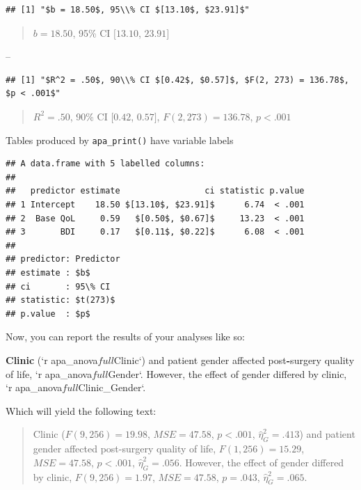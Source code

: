 \documentclass[man,floatsintext]{apa6}
\newenvironment{Shaded}{\begin{snugshade}}{\end{snugshade}}
\newcommand{\KeywordTok}[1]{\textcolor[rgb]{0.13,0.29,0.53}{\textbf{#1}}}
\newcommand{\DataTypeTok}[1]{\textcolor[rgb]{0.13,0.29,0.53}{#1}}
\newcommand{\StringTok}[1]{\textcolor[rgb]{0.31,0.60,0.02}{#1}}
\newcommand{\OperatorTok}[1]{\textcolor[rgb]{0.81,0.36,0.00}{\textbf{#1}}}
\newcommand{\NormalTok}[1]{#1}
\theoremstyle{definition}
\theoremstyle{definition}
\theoremstyle{definition}
\theoremstyle{remark}
\begin{document}
\begin{verbatim}
## [1] "$b = 18.50$, 95\\% CI $[13.10$, $23.91]$"
\end{verbatim}

\begin{quote}
\(b = 18.50\), 95\% CI \([13.10\), \(23.91]\)
\end{quote}

--

\begin{verbatim}
## [1] "$R^2 = .50$, 90\\% CI $[0.42$, $0.57]$, $F(2, 273) = 136.78$, $p < .001$"
\end{verbatim}

\begin{quote}
\(R^2 = .50\), 90\% CI \([0.42\), \(0.57]\), \(F(2, 273) = 136.78\),
\(p < .001\)
\end{quote}

Tables produced by \texttt{apa\_print()} have variable labels

\begin{verbatim}
## A data.frame with 5 labelled columns:
## 
##   predictor estimate                 ci statistic p.value
## 1 Intercept    18.50 $[13.10$, $23.91]$      6.74  < .001
## 2  Base QoL     0.59   $[0.50$, $0.67]$     13.23  < .001
## 3       BDI     0.17   $[0.11$, $0.22]$      6.08  < .001
## 
## predictor: Predictor 
## estimate : $b$ 
## ci       : 95\% CI 
## statistic: $t(273)$ 
## p.value  : $p$
\end{verbatim}

Now, you can report the results of your analyses like so:

\begin{Shaded}
\begin{Highlighting}[]
\KeywordTok{Clinic}\NormalTok{ (}\StringTok{`}\DataTypeTok{r apa_anova$full$Clinic}\StringTok{`}\NormalTok{) and patient gender affected post}\OperatorTok{-}\NormalTok{surgery quality of life, }\StringTok{`}\DataTypeTok{r apa_anova$full$Gender}\StringTok{`}\NormalTok{. However, the effect of gender differed by clinic, }\StringTok{`}\DataTypeTok{r apa_anova$full$Clinic_Gender}\StringTok{`}\NormalTok{.}
\end{Highlighting}
\end{Shaded}

Which will yield the following text:

\begin{quote}
Clinic (\(F(9, 256) = 19.98\), \(\mathit{MSE} = 47.58\), \(p < .001\),
\(\hat{\eta}^2_G = .413\)) and patient gender affected post-surgery
quality of life, \(F(1, 256) = 15.29\), \(\mathit{MSE} = 47.58\),
\(p < .001\), \(\hat{\eta}^2_G = .056\). However, the effect of gender
differed by clinic, \(F(9, 256) = 1.97\), \(\mathit{MSE} = 47.58\),
\(p = .043\), \(\hat{\eta}^2_G = .065\).
\end{quote}
\end{document}
